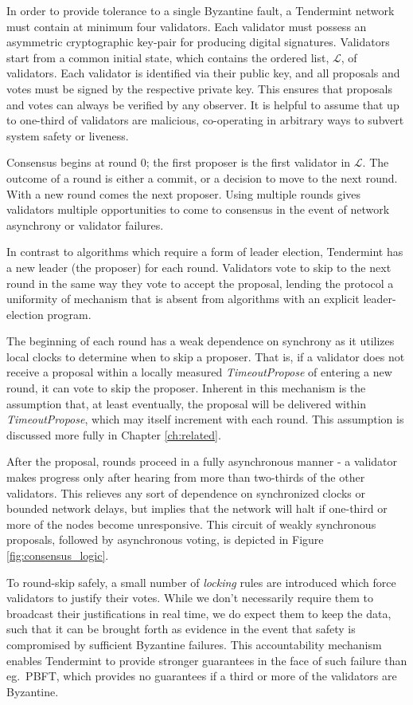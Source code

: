 In order to provide tolerance to a single Byzantine fault, 
a Tendermint network must contain at minimum four validators.
Each validator must possess an asymmetric cryptographic key-pair for producing digital signatures.
Validators start from a common initial state, 
which contains the ordered list, $\mathcal{L}$, of validators.
Each validator is identified via their public key, and 
all proposals and votes must be signed by the respective private key.
This ensures that proposals and votes can always be verified by any observer.
It is helpful to assume that up to one-third of validators are malicious, 
co-operating in arbitrary ways to subvert system safety or liveness.

Consensus begins at round 0; the first proposer is the first validator in $\mathcal{L}$.
The outcome of a round is either a commit, or a decision to move to the next round.
With a new round comes the next proposer.
Using multiple rounds gives validators multiple opportunities 
to come to consensus in the event of network asynchrony or validator failures.

In contrast to algorithms which require a form of leader election, 
Tendermint has a new leader (the proposer) for each round.
Validators vote to skip to the next round in the same way they vote to accept the proposal,
lending the protocol a uniformity of mechanism that is absent 
from algorithms with an explicit leader-election program.

The beginning of each round has a weak dependence on synchrony as it utilizes local clocks to determine when to skip a proposer.
That is, if a validator does not receive a proposal within a locally measured \emph{TimeoutPropose} of entering a new round, it can vote to skip the proposer.
Inherent in this mechanism is the assumption that, at least eventually, the proposal will be delivered within \emph{TimeoutPropose}, which may itself increment with each round.
This assumption is discussed more fully in Chapter \ref{ch:related}.

After the proposal, rounds proceed in a fully asynchronous manner - a validator makes progress only after hearing from more than two-thirds of the other validators.
This relieves any sort of dependence on synchronized clocks or bounded network delays,
but implies that the network will halt if one-third or more of the nodes become unresponsive.
This circuit of weakly synchronous proposals, followed by asynchronous voting, 
is depicted in Figure \ref{fig:consensus_logic}.

To round-skip safely, a small number of \emph{locking} rules 
are introduced which force validators to justify their votes.
While we don't necessarily require them to broadcast their justifications in real time, 
we do expect them to keep the data,
such that it can be brought forth as evidence in the event that safety 
is compromised by sufficient Byzantine failures.
This accountability mechanism enables Tendermint to provide 
stronger guarantees in the face of such failure than eg.~PBFT,
which provides no guarantees if a third or more of the validators are Byzantine.

